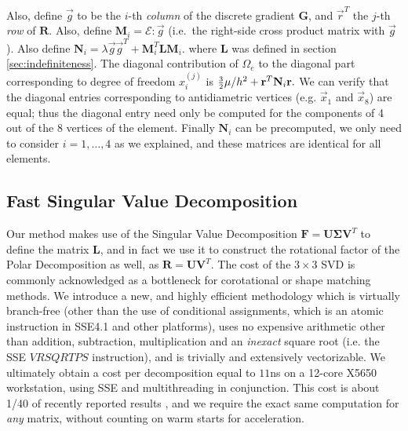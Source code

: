 Also, define $\vec{g}$ to be the $i$-th \emph{column} of the discrete gradient $\mathbf{G}$, and $\vec{r}^T$ the $j$-th \emph{row} of $\mathbf{R}$. Also, define
$\mathbf{M}_i=\mathcal{E}:\vec{g}$ (i.e.\ the right-side cross product matrix with $\vec{g}$). Also define
$
\mathbf{N}_i=\lambda\vec{g}\vec{g}^T+\mathbf{M}_i^T\mathbf{L}\mathbf{M}_i.
$
where $\mathbf{L}$ was defined in section \ref{sec:indefiniteness}. The diagonal contribution of $\Omega_e$ to the diagonal part corresponding to degree of freedom $x_i^{(j)}$ is
$
\hbox{\small$\frac{3}{2}$}\mu/h^2+\vec{r}^T\mathbf{N}_i\vec{r}.
$
We can verify that the diagonal entries corresponding to antidiametric vertices (e.g. $\vec{x}_1$ and $\vec{x}_8$) are equal; thus the diagonal entry need only be computed for the
components of 4 out of the 8 vertices of the element. Finally $\mathbf{N}_i$ can be precomputed, we only need to consider $i=1,\ldots,4$ as we explained, and these matrices are
identical for all elements. 

\subsection{Fast Singular Value Decomposition}

Our method makes use of the Singular Value Decomposition $\mathbf{F}=\mathbf{U\Sigma V}^T$ to define the matrix $\mathbf{L}$, and in fact we use it to construct the rotational factor of
the Polar Decomposition as well, as $\mathbf{R}=\mathbf{UV}^T$. The cost of the $3\times 3$ SVD is commonly acknowledged as a bottleneck for corotational or shape matching methods. We
introduce a new, and highly efficient methodology which is virtually branch-free (other than the use of conditional assignments, which is an atomic instruction in SSE4.1 and other
platforms), uses no expensive arithmetic other than addition, subtraction, multiplication and an \emph{inexact} square root (i.e. the SSE $VRSQRTPS$ instruction), and is trivially
and extensively vectorizable. We ultimately obtain a cost per decomposition equal to $11$ns on a 12-core X5650 workstation, using SSE and multithreading in conjunction. This cost is
about 1/40 of recently reported results \cite{Rivers:2007:FFL}, and we require the exact same computation for \emph{any} matrix, without counting on warm starts for acceleration.


